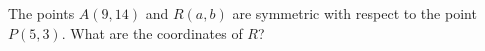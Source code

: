 The points $A(9,14)$ and $R(a,b)$ are symmetric with respect to the point $P(5,3)$. What are the coordinates of $R$?
